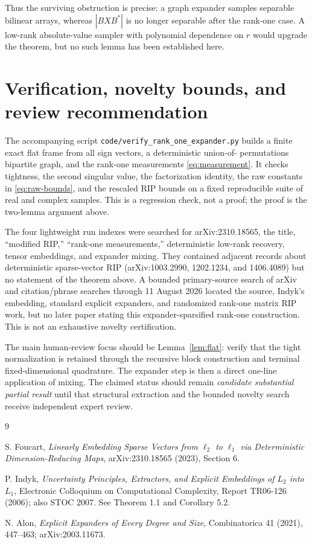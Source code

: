 \documentclass[11pt]{article}
\begin{document}
Thus the surviving obstruction is precise: a graph expander samples
separable bilinear arrays, whereas $|BXB^*|$ is no longer separable after the
rank-one case.  A low-rank absolute-value sampler with polynomial dependence
on $r$ would upgrade the theorem, but no such lemma has been established here.

\section{Verification, novelty bounds, and review recommendation}

The accompanying script \texttt{code/verify\_rank\_one\_expander.py} builds a
finite exact flat frame from all sign vectors, a deterministic union-of-
permutations bipartite graph, and the rank-one measurements
\eqref{eq:measurement}.  It checks tightness, the second singular value, the
factorization identity, the raw constants in \eqref{eq:raw-bounds}, and the
rescaled RIP bounds on a fixed reproducible suite of real and complex samples.
This is a regression check, not a proof; the proof is the two-lemma argument
above.

The four lightweight run indexes were searched for arXiv:2310.18565, the
title, ``modified RIP,'' ``rank-one measurements,'' deterministic low-rank
recovery, tensor embeddings, and expander mixing.  They contained adjacent
records about deterministic sparse-vector RIP (arXiv:1003.2990, 1202.1234,
and 1406.4089) but no statement of the theorem above.  A bounded primary-source
search of arXiv and citation/phrase searches through 11 August 2026 located
the source, Indyk's embedding, standard explicit expanders, and randomized
rank-one matrix RIP work, but no later paper stating this expander-sparsified
rank-one construction.  This is not an exhaustive novelty certification.

The main human-review focus should be Lemma~\ref{lem:flat}: verify that the
tight normalization is retained through the recursive block construction and
terminal fixed-dimensional quadrature.  The expander step is then a direct
one-line application of mixing.  The claimed status should remain
\emph{candidate substantial partial result} until that structural extraction
and the bounded novelty search receive independent expert review.

\begin{thebibliography}{9}

S. Foucart,
\emph{Linearly Embedding Sparse Vectors from $\ell_2$ to $\ell_1$ via
Deterministic Dimension-Reducing Maps},
arXiv:2310.18565 (2023), Section 6.

P. Indyk,
\emph{Uncertainty Principles, Extractors, and Explicit Embeddings of $L_2$
into $L_1$},
Electronic Colloquium on Computational Complexity, Report TR06-126 (2006);
also STOC 2007.  See Theorem 1.1 and Corollary 5.2.

N. Alon,
\emph{Explicit Expanders of Every Degree and Size},
Combinatorica 41 (2021), 447--463; arXiv:2003.11673.

\end{thebibliography}
\end{document}
